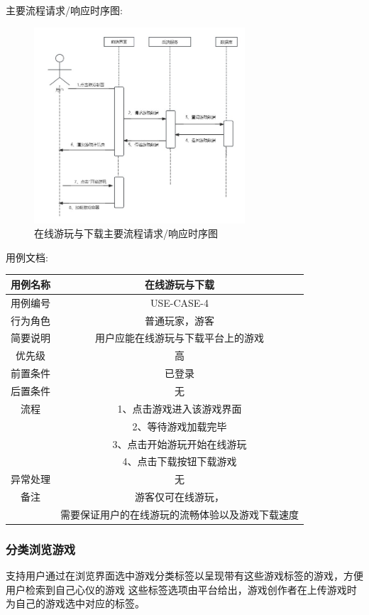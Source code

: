 \documentclass[12pt]{ctexart} %
\begin{document}
主要流程请求/响应时序图:
\begin{figure}[ht]
  \centering
  \includegraphics[width=0.7\textwidth]{yongli4.jpg}
  \caption{在线游玩与下载主要流程请求/响应时序图}
\end{figure}
用例文档:

\begin{tabular}{|c|c|}
  \hline
  用例名称& 在线游玩与下载\\
  \hline
  用例编号 & USE-CASE-4\\
  \hline
  行为角色 & 普通玩家，游客\\
  \hline
  简要说明 & 用户应能在线游玩与下载平台上的游戏\\
  \hline
  优先级 & 高\\
  \hline
  前置条件 & 已登录\\
  \hline
  后置条件 & 无\\
  \hline
  流程 & 1、点击游戏进入该游戏界面\\
      &  2、等待游戏加载完毕\\
      & 3、点击开始游玩开始在线游玩\\
      & 4、点击下载按钮下载游戏\\
  \hline
  异常处理 & 无\\
  \hline
  备注 & 游客仅可在线游玩，\\
       &需要保证用户的在线游玩的流畅体验以及游戏下载速度\\
  \hline
\end{tabular}

\subsubsection{分类浏览游戏}
支持用户通过在浏览界面选中游戏分类标签以呈现带有这些游戏标签的游戏，方便用户检索到自己心仪的游戏
这些标签选项由平台给出，游戏创作者在上传游戏时为自己的游戏选中对应的标签。
\end{document}
